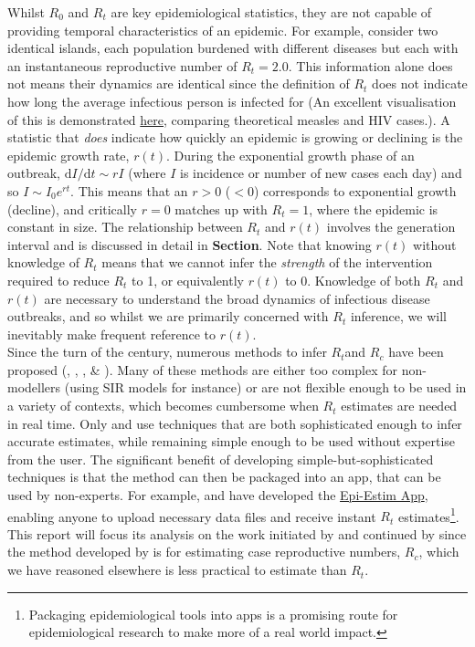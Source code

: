 \documentclass[10pt,journal,compsoc]{IEEEtran}
\begin{document}
 

Whilst $R_0$ and $R_t$ are key epidemiological statistics, they are not capable of providing temporal characteristics of an epidemic. For example, consider two identical islands, each population burdened with different diseases but each with an instantaneous reproductive number of $R_t=2.0$. This information alone does not means their dynamics are identical since the definition of $R_t$ does not indicate how long the average infectious person is infected for (An excellent visualisation of this is demonstrated \href{https://plus.maths.org/content/epidemic-growth-rate}{here}, comparing theoretical measles and HIV cases.). A statistic that \textit{does} indicate how quickly an epidemic is growing or declining is the epidemic growth rate, $r(t)$. During the exponential growth phase of an outbreak, $\mathrm{d}I/\mathrm{d}t \sim rI$ (where $I$ is incidence or number of new cases each day) and so $I \sim I_0 e^{rt}$. This means that an $r>0$ ($<0$) corresponds to exponential growth (decline), and critically $r=0$ matches up with $R_t=1$, where the epidemic is constant in size. The relationship between $R_t$ and $r(t)$ involves the generation interval \cite{Wallinga-Lipsitch} and is discussed in detail in \textbf{Section}. Note that knowing $r(t)$ without knowledge of $R_t$ means that we cannot infer the \textit{strength} of the intervention required to reduce $R_t$ to 1, or equivalently $r(t)$ to 0. Knowledge of both $R_t$ and $r(t)$ are necessary to understand the broad dynamics of infectious disease outbreaks, and so whilst we are primarily concerned with $R_t$ inference, we will inevitably make frequent reference to $r(t)$.\\

Since the turn of the century, numerous methods to infer $R_t$and $R_c$ have been proposed (\cite{Bettencourt-Ribeiro}, \cite{Stadler-Kouyos}, \cite{Volz-Siveroni}, \cite{Wallinga-Teunis} \& \cite{Cori-Ferguson}). Many of these methods are either too complex for non-modellers (using SIR models for instance) or are not flexible enough to be used in a variety of contexts, which becomes cumbersome when $R_t$ estimates are needed in real time. Only \cite{Wallinga-Teunis} and \cite{Cori-Ferguson} use techniques that are both sophisticated enough to infer accurate estimates, while remaining simple enough to be used without expertise from the user. The significant benefit of developing simple-but-sophisticated techniques is that the method can then be packaged into an app, that can be used by non-experts. For example, \cite{Cori-Ferguson} and \cite{Thompson-Stockwin} have developed the \href{https://shiny.dide.imperial.ac.uk/epiestim/}{Epi-Estim App}, enabling anyone to upload necessary data files and receive instant $R_t$ estimates\footnote{Packaging epidemiological tools into apps is a promising route for epidemiological research to make more of a real world impact.}. This report will focus its analysis on the work initiated by \cite{Cori-Ferguson} and continued by \cite{Thompson-Stockwin} since the method developed by \cite{Wallinga-Teunis} is for estimating case reproductive numbers, $R_c$, which we have reasoned elsewhere is less practical to estimate than $R_t$.\\
\end{document}
